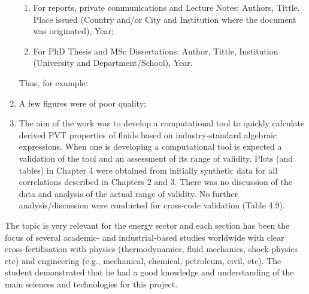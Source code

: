 \documentclass[14pt,twoside]{report}
\begin{document}
\begin{enumerate}
\begin{enumerate}
\item For reports,  private communications and Lecture Notes: Authors, Tittle, Place issued (Country and/or City and Institution where the document was originated), Year;
\item For PhD Thesis and MSc Dissertations: Author, Tittle, Institution (University and Department/School), Year.
\end{enumerate}  
Thus, for example:
%
\item A few figures were of poor quality;
%
\item The aim of the work was to develop a computational tool to quickly calculate derived PVT properties of fluids based on industry-standard algebraic expressions. When one is developing a computational tool is expected a validation of the tool and an assessment of its range of validity. Plots (and tables) in Chapter 4 were obtained from initially synthetic data for all correlations described in Chapters 2 and 3. There was no discussion of the data and analysis of the actual range of validity. No further analysis/discussion were conducted for cross-code validation (Table 4.9). 
% 
\end{enumerate}

The topic is very relevant for the energy sector and each section has been the focus of several academic- and industrial-based studies worldwide with clear cross-fertilisation with physics (thermodynamics, fluid mechanics, shock-physics etc) and engineering (e.g., mechanical, chemical, petroleum, civil, etc). The student demonstrated that he had a good knowledge and understanding of the main sciences and technologies for this project.
\end{document}
